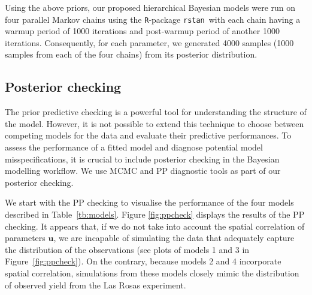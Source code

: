 \documentclass[a4paper]{article}   	%
\newcommand{\R}{\texttt{R}}
\newcommand{\rstan}{\texttt{rstan}}
\begin{document}
	Using the above priors, our proposed hierarchical Bayesian models were run on four parallel Markov chains using the \R-package \rstan\ with each chain having a warmup period of 1000 iterations and post-warmup period of another 1000 iterations. Consequently, for each parameter, we generated 4000 samples (1000 samples from each of the four chains) from its posterior distribution. 	
	
	\subsection{Posterior checking}\label{ss:PostCheck}
	
	The prior predictive checking is a powerful tool for understanding the structure of the model. However, it is not possible to extend this technique to choose between competing models for the data and evaluate their predictive performances. To assess the performance of a fitted model and diagnose potential model misspecifications, it is crucial to include posterior checking in the Bayesian modelling workflow. We use MCMC and PP diagnostic tools as part of our posterior checking. 	
	
	We start with the PP checking to visualise the performance of the four models described in Table~\ref{tb:models}. Figure \ref{fig:ppcheck} displays the results of the PP checking. It appears that, if we do not take into account the spatial correlation of parameters $\bm{u}$, we are incapable of simulating the data that adequately capture the distribution of the observations (see plots of models 1 and 3 in Figure~\ref{fig:ppcheck}). On the contrary, because models 2 and 4 incorporate spatial correlation, simulations from these models closely mimic the distribution of observed yield from the Las Rosas experiment. 	
	
\end{document}
